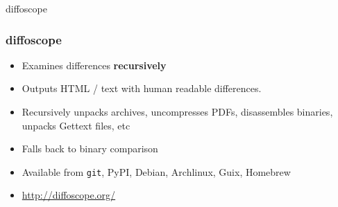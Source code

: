 \documentclass[14pt,aspectratio=169]{beamer}
\begin{document}
{
\begin{frame}{diffoscope}
 \frametitle{diffoscope}
 \begin{itemize}
  \item Examines differences \textbf{recursively}
  \item Outputs HTML / text with human readable differences.
  \item Recursively unpacks archives, uncompresses PDFs, disassembles
  binaries, unpacks Gettext files, etc
  \item Falls back to binary comparison
  \item Available from \texttt{git}, PyPI, Debian, Archlinux, Guix, Homebrew
  \item \url{http://diffoscope.org/}
 \end{itemize}
\end{frame}
}

\begin{frame}
\end{frame}
\end{document}
